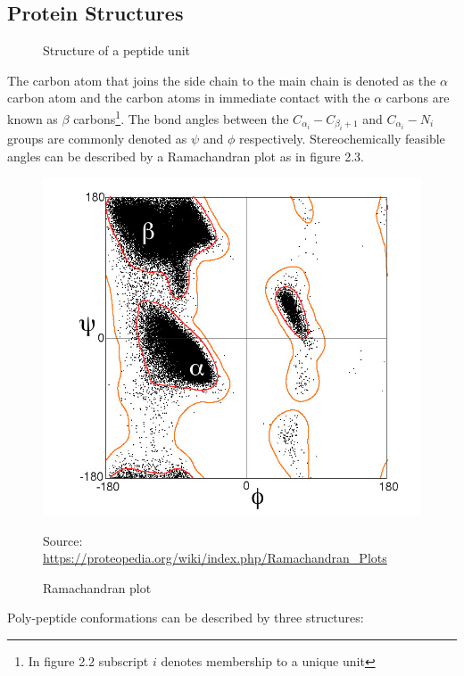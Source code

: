 \subsection{Protein Structures}
\begin{figure}[!htb]
    \caption{Structure of a peptide unit}
    \begin{center}
    \end{center}
\end{figure}

The carbon atom that joins the side chain to
the main chain is denoted as the $\alpha$ carbon
atom and the carbon atoms in immediate contact with the
$\alpha$ carbons are known as $\beta$ 
 carbons\footnote{In figure 2.2 subscript $i$ denotes membership to a unique unit}. The bond angles between the $C_{\alpha_i} - C_{\beta_i+1}$
 and $C_{\alpha_i} - N_i$ groups are commonly denoted
 as $\psi$ and $\phi$ respectively. Stereochemically
 feasible angles can be described by a Ramachandran plot as in figure 2.3. \\

 \begin{figure}[!htb]
    \caption{Ramachandran plot}
    \begin{center}
        \includegraphics[scale=0.6]{Figures/RamachandranPlot}
    \end{center}
    \scriptsize{\dag Source: \url{https://proteopedia.org/wiki/index.php/Ramachandran_Plots}}
 \end{figure}
Poly-peptide conformations can be described by three structures:

